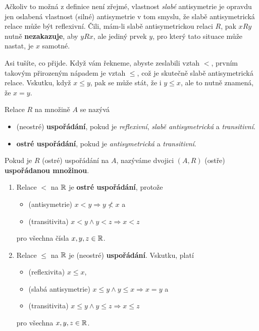 Ačkoliv to možná z definice není zřejmé, vlastnost \emph{slabé} antisymetrie je
opravdu jen oslabená vlastnost (silné) antisymetrie v tom smyslu, že slabě
antisymetrická relace může být reflexivní. Čili, mám-li slabě antisymetrickou
relaci $R$, pak $xRy$ nutně \textbf{nezakazuje}, aby $yRx$, ale jediný prvek
$y$, pro který tato situace může nastat, je $x$ samotné.

\begin{example}
 Asi tušíte, co přijde. Když vám řekneme, abyste zeslabi\-li vztah $<$, prvním
 takovým přirozeným nápadem je vztah $ \leq $, což je skutečně slabě
 antisymetrická relace. Vskutku, když $x \leq y$, pak se může stát, že i $y \leq
 x$, ale to nutně znamená, že $x = y$.
\end{example}

\begin{definition}[Uspořádání]
 Relace $R$ na množině $A$ se nazývá
 \begin{itemize}
  \item (neostré) \textbf{uspořádání}, pokud je \emph{reflexivní}, \emph{slabě
   antisymetrická} a \emph{transitivní}.
  \item \textbf{ostré uspořádání}, pokud je \emph{antisymetrická} a
   \emph{transitivní}.
 \end{itemize}
 Pokud je $R$ (ostré) uspořádání na $A$, nazýváme dvojici $(A,R)$ (ostře)
 \textbf{uspořádanou množinou}.
\end{definition}

\begin{example}
 \hfill
 \vspace*{-.5\parskip}
 \begin{enumerate}
  \item Relace $<$ na $\mathbb{R}$ je \textbf{ostré uspořádání}, protože
   \begin{itemize}
    \item (antisymetrie) $x < y \Rightarrow y \nless x$ a
    \item (transitivita) $x < y \wedge y < z \Rightarrow x < z$
   \end{itemize}
   pro všechna čísla $x,y,z \in \mathbb{R}$.
  \item Relace $ \leq $ na $\mathbb{R}$ je (neostré) \textbf{uspořádání}. Vskutku, platí
   \begin{itemize}
    \item (reflexivita) $x \leq x$,
    \item (slabá antisymetrie) $x \leq y \wedge y \leq x \Rightarrow x = y$ a
    \item (transitivita) $x \leq y \wedge y \leq z \Rightarrow x \leq z$
   \end{itemize}
   pro všechna $x,y,z \in \mathbb{R}$.
 \end{enumerate}
\end{example}

